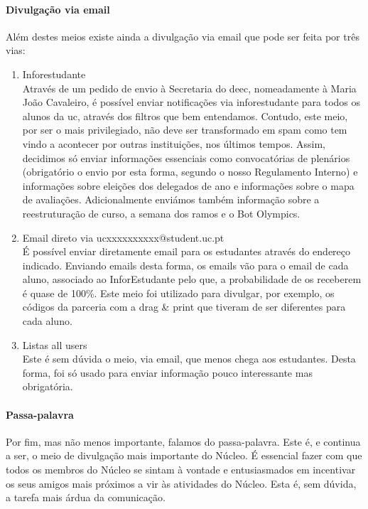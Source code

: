 \paragraph{Divulgação via email}
Além destes meios existe ainda a divulgação via email que pode ser feita por três vias:
\begin{enumerate}
\item Inforestudante\\
Através de um pedido de envio à Secretaria do \acrshort{deec}, nomeadamente à Maria João Cavaleiro, é possível enviar notificações via inforestudante para todos os alunos da \acrshort{uc}, através dos filtros que bem entendamos. Contudo, este meio, por ser o mais privilegiado, não deve ser transformado em spam como tem vindo a acontecer por outras instituições, nos últimos tempos. Assim, decidimos só enviar informações essenciais como convocatórias de plenários (obrigatório o envio por esta forma, segundo o nosso Regulamento Interno) e informações sobre eleições dos delegados de ano e informações sobre o mapa de avaliações. Adicionalmente enviámos também informação sobre a reestruturação de curso, a semana dos ramos e o Bot Olympics.

\item Email direto via ucxxxxxxxxxx@student.uc.pt\\
É possível enviar diretamente email para os estudantes através do endereço indicado. Enviando emails desta forma, os emails vão para o email de cada aluno, associado ao InforEstudante pelo que, a probabilidade de os receberem é quase de 100\%. Este meio foi utilizado para divulgar, por exemplo, os códigos da parceria com a drag \& print que tiveram de ser diferentes para cada aluno.

\item Listas all users\\
Este é sem dúvida o meio, via email, que menos chega aos estudantes. Desta forma, foi só usado para enviar informação pouco interessante mas obrigatória.
\end{enumerate}

\paragraph{Passa-palavra}
Por fim, mas não menos importante, falamos do passa-palavra. Este é, e continua a ser, o meio de divulgação mais importante do Núcleo. É essencial fazer com que todos os membros do Núcleo se sintam à vontade e entusiasmados em incentivar os seus amigos mais próximos a vir às atividades do Núcleo. Esta é, sem dúvida, a tarefa mais árdua da comunicação.


